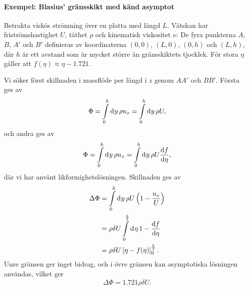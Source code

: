 \paragraph{Exempel: Blasius' gränsskikt med känd asymptot}
Betrakta viskös strömning över en platta med längd $L$. Vätskan har friströmshastighet $U$, täthet $\rho$ och kinematisk viskositet $\nu$. De fyra punkterna $A$, $B$, $A'$ och $B'$ definieras av koordinaterna $(0, 0)$, $(L, 0)$, $(0, h)$ och $(L, h)$, där $h$ är ett avstand som är mycket större än gränsskiktets tjocklek. För stora $\eta$ gäller att $f(\eta) \approx \eta - 1.721$.

Vi söker först skillnaden i massflöde per längd i $z$ genom $AA'$ och $BB'$. Första ges av
\begin{align*}
	\Phi = \int\limits_{0}^{h}\dd[]{y}\rho u_{x} = \int\limits_{0}^{h}\dd[]{y}\rho U,
\end{align*}
och andra ges av
\begin{align*}
	\Phi = \int\limits_{0}^{h}\dd[]{y}\rho u_{x} = \int\limits_{0}^{h}\dd[]{y}\rho U\dv{f}{\eta},
\end{align*}
där vi har använt likformighetslösningen. Skillnaden ges av
\begin{align*}
	\Delta\Phi &= \int\limits_{0}^{h}\dd[]{y}\rho U\left(1 - \frac{u_{x}}{U}\right) \\
	           &= \rho\delta U\int\limits_{0}^{\frac{h}{\delta}}\dd[]{\eta}1 - \dv{f}{\eta} \\
	           &= \rho\delta U\left[\eta - f(\eta)\right]_{0}^{\frac{h}{\delta}}.
\end{align*}
Unre gränsen ger inget bidrag, och i övre gränsen kan asymptotiska lösningen användas, vilket ger
\begin{align*}
	\Delta\Phi = 1.721\rho\delta U.
\end{align*}

